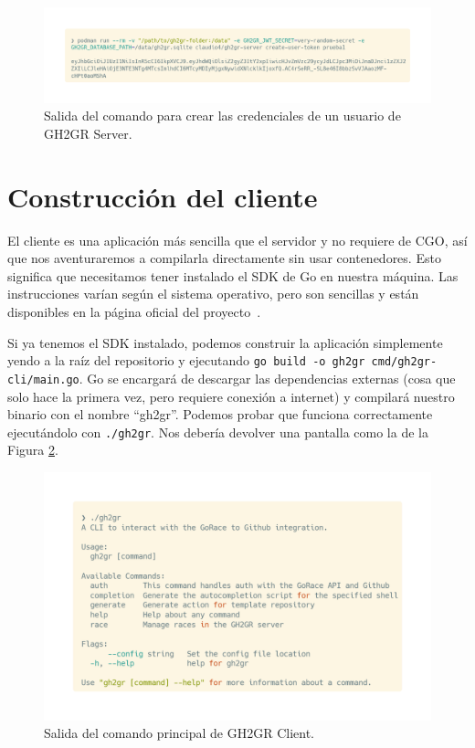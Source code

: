 \begin{figure}
    \centering
    \includegraphics[width=0.75\linewidth]{images/create-user-token.png}
    \caption{Salida del comando para crear las credenciales de un usuario de GH2GR Server.}
    \label{fig:create-user-token}
\end{figure}

\section{Construcción del cliente}
El cliente es una aplicación más sencilla que el servidor y no requiere de CGO, así que nos aventuraremos a compilarla directamente sin usar contenedores. Esto significa que necesitamos tener instalado el SDK de Go en nuestra máquina. Las instrucciones varían según el sistema operativo, pero son sencillas y están disponibles en la página oficial del proyecto~\cite{installGo}.

Si ya tenemos el SDK instalado, podemos construir la aplicación simplemente yendo a la raíz del repositorio y ejecutando \texttt{go build -o gh2gr cmd/gh2gr-cli/main.go}. Go se encargará de descargar las dependencias externas (cosa que solo hace la primera vez, pero requiere conexión a internet) y compilará nuestro binario con el nombre ``gh2gr''. Podemos probar que funciona correctamente ejecutándolo con \texttt{./gh2gr}. Nos debería devolver una pantalla como la de la Figura \ref{fig:client-root-help}.

\begin{figure}
    \centering
    \includegraphics[width=0.75\linewidth]{images/client-root-help.png}
    \caption{Salida del comando principal de GH2GR Client.}
    \label{fig:client-root-help}
\end{figure}

